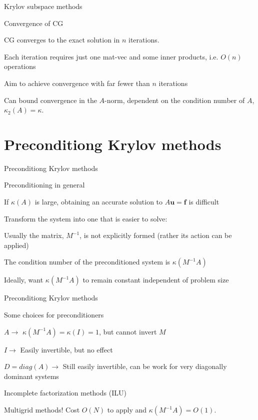 \documentclass[18pt,xcolor=table]{beamer}
\begin{document}
\begin{frame}{Krylov subspace methods}
\begin{block}{Convergence of CG}
\bit
\item CG converges to the exact solution in $n$ iterations.
\item Each iteration requires just one mat-vec and some inner products, i.e. $O(n)$ operations
\item Aim to achieve convergence with far fewer than $n$ iterations
\item Can bound convergence in the $A$-norm, dependent on the condition number of $A$, $\kappa_2(A) = \kappa$.
\eit
{}
\end{block}
\end{frame}


\section{Preconditiong Krylov methods}

\begin{frame}{Preconditiong Krylov methods}
\begin{block}{Preconditioning in general}
\bit
\item If $\kappa(A)$ is large, obtaining an accurate solution to $A\mathbf{u} = \mathbf{f}$ is difficult
\item Transform the system into one that is easier to solve:
\item Usually the matrix, $M^{-1}$, is not explicitly formed (rather its action can be applied)
\item The condition number of the preconditioned system is $\kappa(M^{-1}A)$
\item Ideally, want $\kappa(M^{-1}A)$ to remain constant independent of problem size
\eit
\end{block}
\end{frame}


\begin{frame}{Preconditiong Krylov methods}
\begin{block}{Some choices for preconditioners}
\bit
\item $A \rightarrow$ $\kappa(M^{-1}A) = \kappa(I) = 1$, but cannot invert $M$
\item $I \rightarrow$ Easily invertible, but no effect
\item $D = diag(A) \rightarrow$ Still easily invertible, can be work for very diagonally dominant systems
\item Incomplete factorization methods (ILU)
\item Multigrid methods! Cost $O(N)$ to apply and $\kappa(M^{-1}A) = O(1)$.
\eit
\end{block}
\end{frame}
\end{document}
